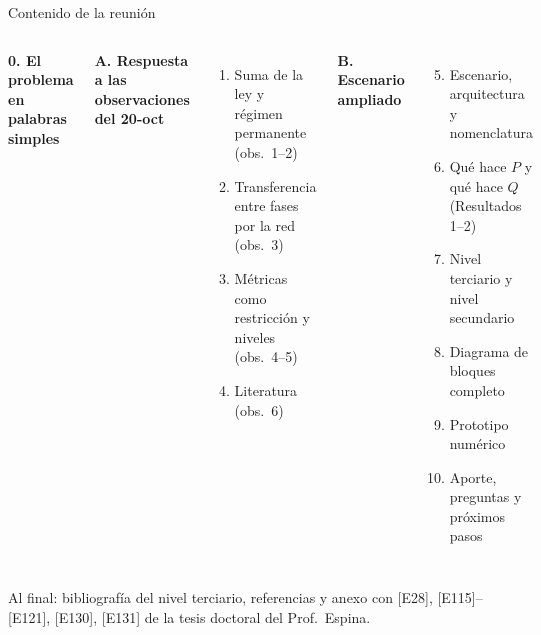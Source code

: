 \documentclass[aspectratio=169,10pt,t]{beamer}
\begin{document}
\begin{frame}{Contenido de la reunión}
  \begin{columns}[T,onlytextwidth]
    \textbf{\color{usachT}0. El problema en palabras simples}

    \vspace{6pt}
    \textbf{\color{usachT}A. Respuesta a las observaciones del 20-oct}
    \begin{enumerate}\setlength\itemsep{1pt}
      \item Suma de la ley y régimen permanente (obs.\ 1--2)
      \item Transferencia entre fases por la red (obs.\ 3)
      \item Métricas como restricción y niveles (obs.\ 4--5)
      \item Literatura (obs.\ 6)
    \end{enumerate}
    \textbf{\color{usachT}B. Escenario ampliado}
    \begin{enumerate}\setcounter{enumi}{4}\setlength\itemsep{1pt}
      \item Escenario, arquitectura y nomenclatura
      \item Qué hace $P$ y qué hace $Q$ (Resultados 1--2)
      \item Nivel terciario y nivel secundario
      \item Diagrama de bloques completo
      \item Prototipo numérico
      \item Aporte, preguntas y próximos pasos
    \end{enumerate}
  \end{columns}
  \vspace{8pt}
  {\footnotesize Al final: bibliografía del nivel terciario, referencias y anexo con [E28], [E115]--[E121], [E130], [E131] de la tesis doctoral del Prof.\ Espina.}
\end{frame}
\end{document}

